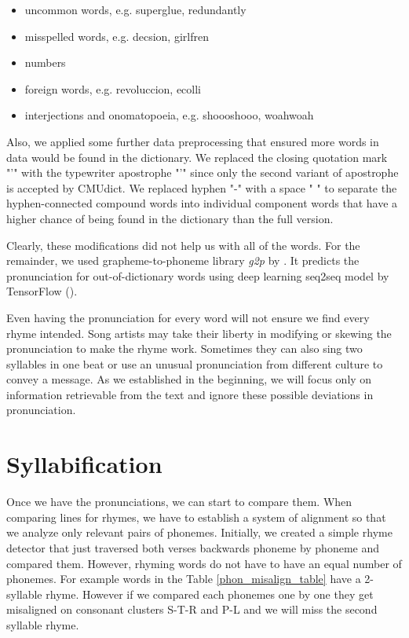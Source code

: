 \begin{itemize}
	\item uncommon words, e.g. superglue, redundantly
	\item misspelled words, e.g. decsion, girlfren
	\item numbers
	\item foreign words, e.g. revoluccion, ecolli
	\item interjections and onomatopoeia, e.g. shoooshooo, woahwoah
\end{itemize}

Also, we applied some further data preprocessing that ensured more words in data would be found in the dictionary. We replaced the closing quotation mark "’" with the typewriter apostrophe "'" since only the second variant of apostrophe is accepted by CMUdict. We replaced hyphen "-" with a space " " to separate the hyphen-connected compound words into individual component words that have a higher chance of being found in the dictionary than the full version.

Clearly, these modifications did not help us with all of the words. For the remainder, we used grapheme-to-phoneme library \textit{g2p} by \cite{g2pE2019}. It predicts the pronunciation for out-of-dictionary words using deep learning seq2seq model by TensorFlow (\cite{tensorflow2015-whitepaper}).

Even having the pronunciation for every word will not ensure we find every rhyme intended. Song artists may take their liberty in modifying or skewing the pronunciation to make the rhyme work. Sometimes they can also sing two syllables in one beat or use an unusual pronunciation from different culture to convey a message. As we established in the beginning, we will focus only on information retrievable from the text and ignore these possible deviations in pronunciation.

\section{Syllabification}
Once we have the pronunciations, we can start to compare them. When comparing lines for rhymes, we have to establish a system of alignment so that we analyze only relevant pairs of phonemes. Initially, we created a simple rhyme detector that just traversed both verses backwards phoneme by phoneme and compared them. However, rhyming words do not have to have an equal number of phonemes. For example words in the Table \ref{phon_misalign_table} have a 2-syllable rhyme. However if we compared each phonemes one by one they get misaligned on consonant clusters S-T-R and P-L and we will miss the second syllable rhyme.

